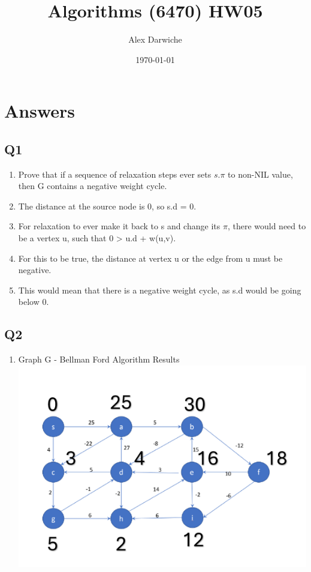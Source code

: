\documentclass{article}
\title{Algorithms (6470) HW05}
\author{Alex Darwiche}
\date{\today}
\begin{document}
\maketitle

\section*{Answers}

\subsection*{Q1}
\begin{enumerate}[label=(\alph*)]
    \item Prove that if a sequence of relaxation steps ever sets $s.\pi$ to non-NIL value, then G contains a negative weight cycle.
    \item The distance at the source node is 0, so s.d = 0.
    \item For relaxation to ever make it back to s and change its $\pi$, there would need to be a vertex u, such that 0 > u.d + w(u,v).
    \item For this to be true, the distance at vertex u or the edge from u must be negative.
    \item This would mean that there is a negative weight cycle, as s.d would be going below 0.

\end{enumerate}

\subsection*{Q2}
\begin{enumerate}[label=(\alph*)]
    \item Graph G - Bellman Ford Algorithm Results
    \subitem \includegraphics[width=.75\textwidth]{problem2.png}
\end{enumerate}
\end{document}
